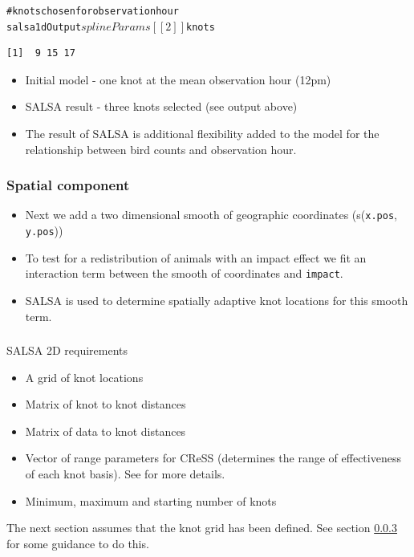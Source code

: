 \documentclass[11pt, a4paper]{article}
\makeatletter
\newcommand{\hlcomment}[1]{\textcolor[rgb]{0.180392156862745,0.6,0.341176470588235}{#1}}%
\newenvironment{kframe}{%
 \def\at@end@of@kframe{}%
 \ifinner\ifhmode%
  \def\at@end@of@kframe{\end{minipage}}%
  \begin{minipage}{\columnwidth}%
 \fi\fi%
 \def\FrameCommand##1{\hskip\@totalleftmargin \hskip-\fboxsep
 \colorbox{shadecolor}{##1}\hskip-\fboxsep
     \hskip-\linewidth \hskip-\@totalleftmargin \hskip\columnwidth}%
 \MakeFramed {\advance\hsize-\width
   \@totalleftmargin\z@ \linewidth\hsize
   \@setminipage}}%
 {\par\unskip\endMakeFramed%
 \at@end@of@kframe}
\newenvironment{knitrout}{}{} %
\makeatother
\begin{document}
\begin{frame}[fragile]
\frametitle{}
\begin{knitrout}\footnotesize
{}\color{fgcolor}\begin{kframe}
\begin{alltt}
\hlcomment{# knots chosen for observation hour}
salsa1dOutput$splineParams[[2]]$knots
\end{alltt}
\begin{verbatim}
[1]  9 15 17
\end{verbatim}
\end{kframe}
\end{knitrout}

\begin{itemize}
\item Initial model - one knot at the mean observation hour (12pm) 
\item SALSA result - three knots selected (see output above)
\item The result of SALSA is additional flexibility added to the model for the relationship between bird counts and observation hour.
\end{itemize}
\end{frame}

\begin{frame}[fragile]
\frametitle{Spatial component}
\begin{itemize}
\item Next we add a two dimensional smooth of geographic coordinates (s({\tt x.pos}, {\tt y.pos}))
\item To test for a redistribution of animals with an impact effect we fit an interaction term between the smooth of coordinates and {\tt impact}.
\item SALSA is used to determine spatially adaptive knot locations for this smooth term.
\end{itemize}
\end{frame}

\begin{frame}
\frametitle{}
\begin{block}{SALSA 2D requirements}
\begin{itemize}
\item A grid of knot locations
\item Matrix of knot to knot distances 
\item Matrix of data to knot distances
\item Vector of range parameters for CReSS (determines the range of effectiveness of each knot basis).  See \citep{ScottH2013} for more details.
\item Minimum, maximum and starting number of knots
\end{itemize}
\end{block}
The next section assumes that the knot grid has been defined. See section \ref{} for some guidance to do this.
\end{frame}
\end{document}
